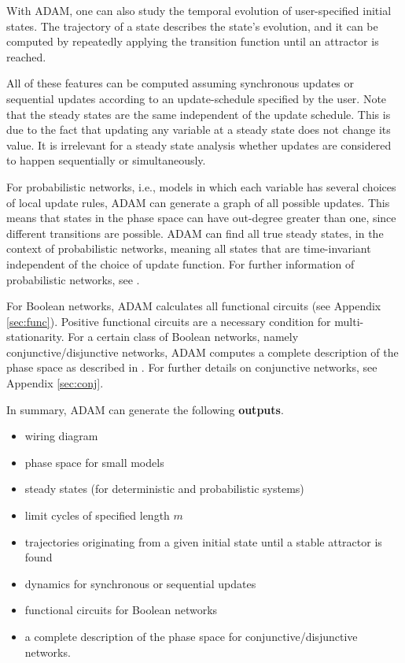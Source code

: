 \documentclass[10pt]{bmc_article}
\newenvironment{bmcformat}{\begin{raggedright}\baselineskip20pt\sloppy\setboolean{publ}{false}}{\end{raggedright}\baselineskip20pt\sloppy}
\begin{document}
\begin{bmcformat}
With ADAM, one can also study the temporal evolution of user-specified initial states. The trajectory of a state describes the state's evolution, and it can be computed by repeatedly applying the transition function until an attractor is reached.  

All of these features can be computed assuming synchronous updates or sequential updates according to an update-schedule specified by the user. Note that the steady
states are the same independent of the update schedule. This is due to the
fact that updating any variable at a steady state does not change its value.
It is irrelevant for a steady state analysis whether updates are considered to happen sequentially or simultaneously.

For probabilistic networks, i.e., models in which each variable has several choices of local update rules, ADAM can generate a graph of all possible updates. This means that states in the phase space can have out-degree greater than one, since different transitions are possible. ADAM can find all true steady states, in the context of probabilistic networks, meaning all states that are time-invariant independent of the choice of update function. For further information of probabilistic networks, see \cite{shmulevich}.

For Boolean networks, ADAM calculates all functional circuits (see Appendix \ref{sec:func}). Positive functional circuits are a necessary condition for multi-stationarity. For a certain class of Boolean networks, namely conjunctive/disjunctive networks, ADAM computes a complete description of the phase space as described in \cite{conjunctive}. For further details on conjunctive networks, see Appendix \ref{sec:conj}.

In summary, ADAM can generate the following {\bf outputs}.
\begin{itemize}
\item wiring diagram
\item phase space for small models
\item steady states (for deterministic and probabilistic systems)
\item limit cycles of specified length $m$
\item trajectories originating from a given initial state until a stable
attractor is found
\item dynamics for synchronous or sequential updates
\item functional circuits for Boolean networks
\item a complete description of the phase space for conjunctive/disjunctive
networks.
\end{itemize}


\end{bmcformat}
\end{document}
